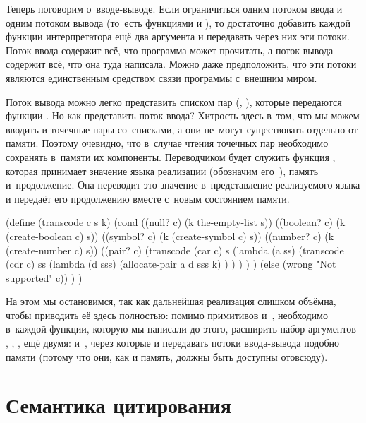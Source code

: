 Теперь поговорим о~вводе-выводе. Если ограничиться одним потоком ввода и одним
потоком вывода (то~есть функциями  и ), то достаточно
добавить каждой функции интерпретатора ещё два аргумента и передавать через них
эти потоки. Поток ввода содержит всё, что программа может прочитать, а поток
вывода содержит всё, что она туда написала. Можно даже предположить, что эти
потоки являются единственным средством связи программы с~внешним миром.

Поток вывода можно легко представить списком пар (, ),
которые передаются функции . Но как представить поток ввода?
Хитрость здесь в~том, что мы можем вводить и точечные пары со~списками, а они
не~могут существовать отдельно от памяти. Поэтому очевидно, что в~случае чтения
точечных пар необходимо сохранять в~памяти их компоненты. Переводчиком будет
служить функция , которая принимает значение языка реализации
(обозначим его~), память и~продолжение. Она переводит это значение
в~представление реализуемого языка и передаёт его продолжению вместе с~новым
состоянием памяти.

\begin{code:lisp}
(define (transcode c s k)
  (cond
    ((null? c)    (k the-empty-list s))
    ((boolean? c) (k (create-boolean c) s))
    ((symbol? c)  (k (create-symbol c) s))
    ((number? c)  (k (create-number c) s))
    ((pair? c)
     (transcode (car c)
                s
                (lambda (a ss)
                  (transcode (cdr c)
                             ss
                             (lambda (d sss)
                               (allocate-pair a d sss k) ) ) ) ) )
    (else (wrong "Not supported" c)) ) )
\end{code:lisp}

На этом мы остановимся, так как дальнейшая реализация слишком объёмна, чтобы
приводить её здесь полностью: помимо примитивов  и~,
необходимо в~каждой функции, которую мы написали до этого, расширить набор
аргументов , , ,  ещё двумя:  и~, через
которые и передавать потоки ввода-вывода подобно памяти (потому что они, как и
память, должны быть доступны отовсюду).


\section{Семантика цитирования}\label{assignment/sect:quotation}

